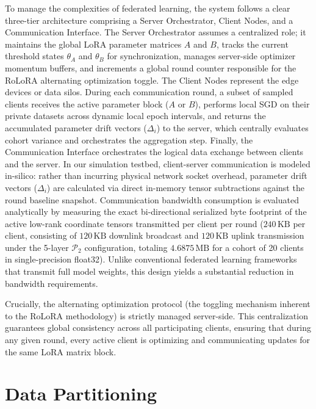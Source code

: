 To manage the complexities of federated learning, the system follows a clear three-tier architecture comprising a Server Orchestrator, Client Nodes, and a Communication Interface. The Server Orchestrator assumes a centralized role; it maintains the global LoRA parameter matrices $A$ and $B$, tracks the current threshold states $\theta_A$ and $\theta_B$ for synchronization, manages server-side optimizer momentum buffers, and increments a global round counter responsible for the RoLoRA alternating optimization toggle. The Client Nodes represent the edge devices or data silos. During each communication round, a subset of sampled clients receives the active parameter block ($A$ or $B$), performs local SGD on their private datasets across dynamic local epoch intervals, and returns the accumulated parameter drift vectors ($\Delta_i$) to the server, which centrally evaluates cohort variance and orchestrates the aggregation step. Finally, the Communication Interface orchestrates the logical data exchange between clients and the server. In our simulation testbed, client-server communication is modeled in-silico: rather than incurring physical network socket overhead, parameter drift vectors ($\Delta_i$) are calculated via direct in-memory tensor subtractions against the round baseline snapshot. Communication bandwidth consumption is evaluated analytically by measuring the exact bi-directional serialized byte footprint of the active low-rank coordinate tensors transmitted per client per round ($240\,\text{KB}$ per client, consisting of $120\,\text{KB}$ downlink broadcast and $120\,\text{KB}$ uplink transmission under the 5-layer $\mathcal{P}_2$ configuration, totaling $4.6875\,\text{MB}$ for a cohort of 20 clients in single-precision float32). Unlike conventional federated learning frameworks that transmit full model weights, this design yields a substantial reduction in bandwidth requirements. 

Crucially, the alternating optimization protocol (the toggling mechanism inherent to the RoLoRA methodology) is strictly managed server-side. This centralization guarantees global consistency across all participating clients, ensuring that during any given round, every active client is optimizing and communicating updates for the same LoRA matrix block.


\section{Data Partitioning}
\label{sec:impl_data_partitioning}

